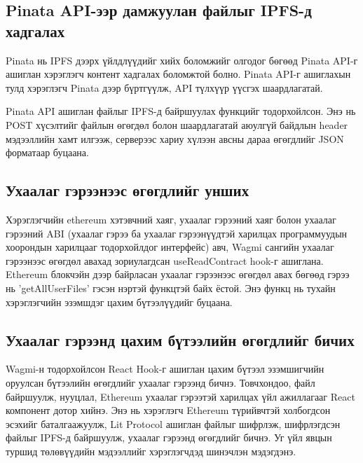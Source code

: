 \subsection{Pinata API-ээр дамжуулан файлыг IPFS-д хадгалах}
Pinata нь IPFS дээрх үйлдлүүдийг хийх боломжийг олгодог бөгөөд Pinata API-г ашиглан хэрэглэгч контент хадгалах боломжтой болно. Pinata API-г ашиглахын тулд хэрэглэгч Pinata дээр бүртгүүлж, API түлхүүр үүсгэх шаардлагатай.

Pinata API ашиглан файлыг IPFS-д байршуулах функцийг тодорхойлсон. Энэ нь POST хүсэлтийг файлын өгөгдөл болон шаардлагатай аюулгүй байдлын header мэдээллийн хамт илгээж, серверээс хариу хүлээн авсны дараа өгөгдлийг JSON форматаар буцаана.


\subsection{Ухаалаг гэрээнээс өгөгдлийг унших}
Хэрэглэгчийн ethereum хэтэвчний хаяг, ухаалаг гэрээний хаяг болон ухаалаг гэрээний ABI (ухаалаг гэрээ ба ухаалаг гэрээнүүдтэй харилцах программуудын хоорондын харилцааг тодорхойлдог интерфейс) авч, Wagmi сангийн ухаалаг гэрээнээс өгөгдөл авахад зориулагдсан useReadContract hook-г ашиглана. Ethereum блокчэйн дээр байрласан ухаалаг гэрээнээс өгөгдөл авах бөгөөд гэрээ нь 'getAllUserFiles' гэсэн нэртэй функцтэй байх ёстой. Энэ функц нь тухайн хэрэглэгчийн эзэмшдэг цахим бүтээлүүдийг буцаана.


\subsection{Ухаалаг гэрээнд цахим бүтээлийн өгөгдлийг бичих}
Wagmi-н тодорхойлсон React Hook-г ашиглан цахим бүтээл эзэмшигчийн оруулсан бүтээлийн өгөгдлийг ухаалаг гэрээнд бичнэ.
Товчхондоо, файл байршуулж, нууцлал, Ethereum ухаалаг гэрээтэй харилцах үйл ажиллагааг React компонент дотор хийнэ. Энэ нь хэрэглэгч Ethereum түрийвчтэй холбогдсон эсэхийг баталгаажуулж, Lit Protocol ашиглан файлыг шифрлэж, шифрлэгдсэн файлыг IPFS-д байршуулж, ухаалаг гэрээнд өгөгдлийг бичнэ. Уг үйл явцын туршид төлөвүүдийн мэдээллийг хэрэглэгчдэд шинэчлэн мэдэгдэнэ.



